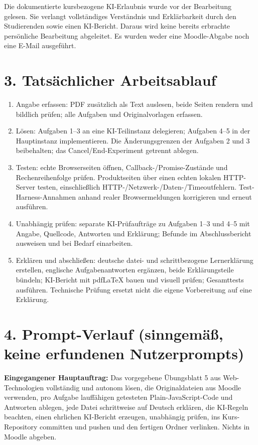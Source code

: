 \documentclass[a4paper,10pt]{article}
\begin{document}
Die dokumentierte kursbezogene KI-Erlaubnis wurde vor der Bearbeitung gelesen. Sie verlangt vollständiges Verständnis und Erklärbarkeit durch den Studierenden sowie einen KI-Bericht. Daraus wird keine bereits erbrachte persönliche Bearbeitung abgeleitet. Es wurden weder eine Moodle-Abgabe noch eine E-Mail ausgeführt.

\section*{3. Tatsächlicher Arbeitsablauf}
\begin{enumerate}[leftmargin=*,nosep]
\item Angabe erfassen: PDF zusätzlich als Text auslesen, beide Seiten rendern und bildlich prüfen; alle Aufgaben und Originalvorlagen erfassen.
\item Lösen: Aufgaben 1--3 an eine KI-Teilinstanz delegieren; Aufgaben 4--5 in der Hauptinstanz implementieren. Die Änderungsgrenzen der Aufgaben 2 und 3 beibehalten; das Cancel/End-Experiment getrennt ablegen.
\item Testen: echte Browserseiten öffnen, Callback-/Promise-Zustände und Rechenreihenfolge prüfen. Produktseiten über einen echten lokalen HTTP-Server testen, einschließlich HTTP-/Netzwerk-/Daten-/Timeoutfehlern. Test-Harness-Annahmen anhand realer Browsermeldungen korrigieren und erneut ausführen.
\item Unabhängig prüfen: separate KI-Prüfaufträge zu Aufgaben 1--3 und 4--5 mit Angabe, Quellcode, Antworten und Erklärung; Befunde im Abschlussbericht ausweisen und bei Bedarf einarbeiten.
\item Erklären und abschließen: deutsche datei- und schrittbezogene Lernerklärung erstellen, englische Aufgabenantworten ergänzen, beide Erklärungsteile bündeln; KI-Bericht mit pdfLaTeX bauen und visuell prüfen; Gesamttests ausführen. Technische Prüfung ersetzt nicht die eigene Vorbereitung auf eine Erklärung.
\end{enumerate}

\newpage
\section*{4. Prompt-Verlauf (sinngemäß, keine erfundenen Nutzerprompts)}
\textbf{Eingegangener Hauptauftrag:} Das vorgegebene Übungsblatt 5 aus Web-Technologien vollständig und autonom lösen, die Originaldateien aus Moodle verwenden, pro Aufgabe lauffähigen getesteten Plain-JavaScript-Code und Antworten ablegen, jede Datei schrittweise auf Deutsch erklären, die KI-Regeln beachten, einen ehrlichen KI-Bericht erzeugen, unabhängig prüfen, ins Kurs-Repository committen und pushen und den fertigen Ordner verlinken. Nichts in Moodle abgeben.
\end{document}
